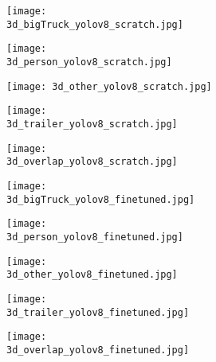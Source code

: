 \begin{figure}
	\begin{subfigure}{\textwidth}
		\centering
		\begin{subfigure}{0.2\textwidth}
			\texttt{[image: 3d\_bigTruck\_yolov8\_scratch.jpg]}
		\end{subfigure}\hfill
		\begin{subfigure}{0.2\textwidth}
			\texttt{[image: 3d\_person\_yolov8\_scratch.jpg]}
		\end{subfigure}\hfill
		\begin{subfigure}{0.2\textwidth}
			\texttt{[image: 3d\_other\_yolov8\_scratch.jpg]}
		\end{subfigure}\hfill
		\begin{subfigure}{0.2\textwidth}
			\texttt{[image: 3d\_trailer\_yolov8\_scratch.jpg]}
		\end{subfigure}\hfill
		\begin{subfigure}{0.2\textwidth}
			\texttt{[image: 3d\_overlap\_yolov8\_scratch.jpg]}
		\end{subfigure}
		\vspace{-\baselineskip}
	\end{subfigure}
	
	\begin{subfigure}{\textwidth}
		\centering
		\begin{subfigure}{0.2\textwidth}
			\texttt{[image: 3d\_bigTruck\_yolov8\_finetuned.jpg]}
		\end{subfigure}\hfill
		\begin{subfigure}{0.2\textwidth}
			\texttt{[image: 3d\_person\_yolov8\_finetuned.jpg]}
		\end{subfigure}\hfill
		\begin{subfigure}{0.2\textwidth}
			\texttt{[image: 3d\_other\_yolov8\_finetuned.jpg]}
		\end{subfigure}\hfill
		\begin{subfigure}{0.2\textwidth}
			\texttt{[image: 3d\_trailer\_yolov8\_finetuned.jpg]}
		\end{subfigure}\hfill
		\begin{subfigure}{0.2\textwidth}
			\texttt{[image: 3d\_overlap\_yolov8\_finetuned.jpg]}
		\end{subfigure}
		\vspace{-\baselineskip}
	\end{subfigure}
	

\end{figure}
